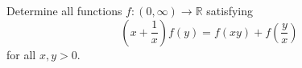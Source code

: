 Determine all functions $f:(0,\infty)\to\mathbb{R}$ satisfying \[\left(x+\frac{1}{x}\right)f(y)=f(xy)+f\left(\frac{y}{x}\right)\] for all $x,y>0$.
